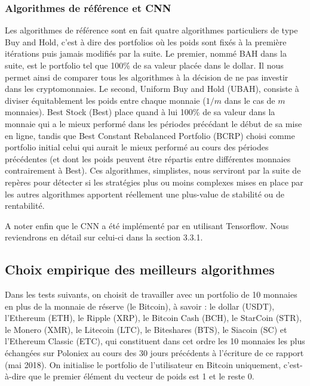 \documentclass[a4paper, 10pt]{article}
\begin{document}
\subsubsection{Algorithmes de référence et CNN}

Les algorithmes de référence sont en fait quatre algorithmes particuliers de type Buy and Hold, c'est à dire des portfolios où les poids sont fixés à la première itérations puis jamais modifiés par la suite. Le premier, nommé BAH dans la suite, est le portfolio tel que 100\% de sa valeur placée dans le dollar. Il nous permet ainsi de comparer tous les algorithmes à la décision de ne pas investir dans les cryptomonnaies. Le second, Uniform Buy and Hold (UBAH), consiste à diviser équitablement les poids entre chaque monnaie ($1/m$ dans le cas de $m$ monnaies). Best Stock (Best) place quand à lui 100\% de sa valeur dans la monnaie qui a le mieux performé dans les périodes précédant le début de sa mise en ligne, tandis que Best Constant Rebalanced Portfolio (BCRP) choisi comme portfolio initial celui qui aurait le mieux performé au cours des périodes précédentes (et dont les poids peuvent être répartis entre différentes monnaies contrairement à Best). Ces algorithmes, simplistes, nous serviront par la suite de repères pour détecter si les stratégies plus ou moins complexes mises en place par les autres algorithmes apportent réellement une plus-value de stabilité ou de rentabilité.

A noter enfin que le CNN a été implémenté par \citet{Jiang2017} en utilisant Tensorflow. Nous reviendrons en détail sur celui-ci dans la section 3.3.1.

\subsection{Choix empirique des meilleurs algorithmes}

Dans les tests suivants, on choisit de travailler avec un portfolio de 10 monnaies en plus de la monnaie de réserve (le Bitcoin), à savoir : le dollar (USDT), l'Ethereum (ETH), le Ripple (XRP), le Bitcoin Cash (BCH), le StarCoin (STR), le Monero (XMR), le Litecoin (LTC), le Biteshares (BTS), le Siacoin (SC) et l'Ethereum Classic (ETC), qui constituent dans cet ordre les 10 monnaies les plus échangées sur Poloniex au cours des 30 jours précédents à l'écriture de ce rapport (mai 2018). On initialise le portfolio de l'utilisateur en Bitcoin uniquement, c'est-à-dire que le premier élément du vecteur de poids est 1 et le reste 0.
\end{document}
